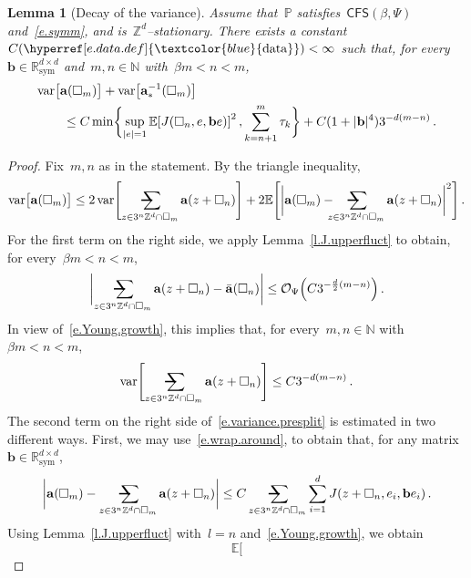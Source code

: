 \documentclass[11pt,twoside]{article} %
\makeatletter
\let\oldsquare\square %
\renewcommand{\square}{\oldsquare}
\numberwithin{equation}{section}
\newtheorem{lemma}[theorem]{Lemma}
\theoremstyle{definition}
\newcommand{\dataref}{\hyperref[e.data.def]{\textcolor{blue}{\ensuremath{\mathrm{data}}}}}
\let\originalleft\left
\let\originalright\right
\renewcommand{\left}{\mathopen{}\mathclose\bgroup\originalleft}
\renewcommand{\right}{\aftergroup\egroup\originalright}
\newcommand*{\N}{\ensuremath{\mathbb{N}}}
\newcommand*{\R}{\ensuremath{\mathbb{R}}}
\newcommand*{\Zd}{\ensuremath{\mathbb{Z}^d}}
\renewcommand{\b}{\ensuremath{\mathbf{b}}}
\newcommand{\sym}{\mathrm{sym}}
\renewcommand{\a}{\mathbf{a}}
\newcommand{\ahom}{\bar{\a}}
\newcommand{\cu}{\square}
\renewcommand{\P}{\mathbb{P}}
\newcommand{\E}{\mathbb{E}}
\renewcommand{\O}{\mathcal{O}}
\DeclareMathOperator{\var}{var}
\newcommand{\avsum}{\mathop{\mathpalette\avsuminner\relax}\displaylimits}
\newcommand\avsuminner[2]{%
  {\sbox0{$\m@th#1\sum$}%
   \vphantom{\usebox0}%
   \ooalign{%
     \hidewidth
     \smash{\,\rule[.23em]{8.8pt}{1.1pt} \relax}%
     \hidewidth\cr
   ~$\m@th#1\sum$\cr
   }%
  }%
}
\newcommand{\CFS}{\mathsf{CFS}}
\makeatother
\begin{document}
\begin{lemma}[Decay of the variance]
\label{l.flatness}
Assume that~$\P$ satisfies~$\CFS(\beta,\Psi)$ and~\eqref{e.symm}, and is~$\Zd$--stationary.
There exists a constant~$C(\dataref)<\infty$ such that, for every~$\b\in \R^{d\times d}_{\sym}$ and~$m,n \in\N$ with~$\beta m  < n < m$,  
\begin{align}
\label{e.variance.J2}
\lefteqn{
\var \bigl[  \a(\cu_m) \bigr] 
+
\var \bigl[  \a_*^{-1}(\cu_m) \bigr] 
} \qquad & 
\notag \\ & 
\leq
C \min \biggl\{ 
\sup_{|e|=1}
\E \left[ J(\cu_n,e,\b e) \right]^2
\,,
\sum_{k=n+1}^m \tau_k
\biggr\}
+
C(1+|\b|^4) 3^{-d(m-n)} 
\,.
\end{align}
\end{lemma}
\begin{proof}
Fix~$m,n$ as in the statement. By the triangle inequality, 
\begin{equation}
\label{e.variance.presplit}
\var\bigl [ \a(\cu_m) \bigr] 
\leq 
2\var \Biggl[ \avsum_{z\in 3^n\Zd\cap\cu_m}
\a(z+\cu_n) \Biggr] 
+
2 \E \Biggl[
\biggl| \a(\cu_m) - \!\!\!\! \avsum_{z\in 3^n\Zd\cap\cu_m}
\a(z+\cu_n) \biggr|^2 \Biggr]
\,.
\end{equation}
For the first term on the right side, we apply Lemma~\ref{l.J.upperfluct} to obtain, for every~$\beta m < n < m$, 
\begin{align*}
\biggl| \avsum_{z\in 3^{n} \Zd\cap\cu_{m}} 
\a(z+\cu_{n}) 
- 
\ahom(\cu_n) \biggr|
\leq
\O_\Psi \left( C3^{-\frac d2(m-n)} \right)
\,.
\end{align*}
In view of~\eqref{e.Young.growth}, this implies that, for every~$m,n\in\N$ with~$\beta m<n<m$, 
\begin{equation}
\label{e.varbounda}
\var \Biggl[ \avsum_{z\in 3^n \Zd\cap\cu_{m}} 
\a(z+\cu_{n}) \Biggr] 
\leq 
C 3^{-d (m-n)}
\,.
\end{equation}
The second term on the right side of~\eqref{e.variance.presplit} is estimated in two different ways. 
First, we may use~\eqref{e.wrap.around}, to obtain that, 
for any matrix~$\b \in \R^{d\times d}_{\sym}$,
\begin{equation}
\label{e.wrap.app}
\biggl| \a(\cu_m) -  \avsum_{z\in 3^n\Zd\cap\cu_m}
\a(z+\cu_n) \biggr|
\leq 
C \avsum_{z\in 3^n\Zd\cap\cu_m}
\sum_{i=1}^d
J(z+\cu_n,e_i,\b e_i) 
\,.
\end{equation}
Using Lemma~\ref{l.J.upperfluct} with~$l=n$ and~\eqref{e.Young.growth}, we obtain 
\begin{equation}
\label{e.variance.quad.smack}
\E \Biggl[

\end{equation}
\end{proof}
\end{document}
